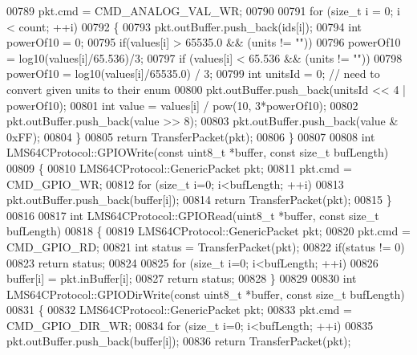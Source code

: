 \begin{DoxyCode}
{{{{{{{00789     pkt.cmd = CMD_ANALOG_VAL_WR;
00790 
00791     \textcolor{keywordflow}{for} (\textcolor{keywordtype}{size\_t} i = 0; i < count; ++i)
00792     \{
00793         pkt.outBuffer.push\_back(ids[i]);
00794         \textcolor{keywordtype}{int} powerOf10 = 0;
00795         \textcolor{keywordflow}{if}(values[i] > 65535.0 && (units != \textcolor{stringliteral}{""}))
00796             powerOf10 = log10(values[i]/65.536)/3;
00797         \textcolor{keywordflow}{if} (values[i] < 65.536 && (units != \textcolor{stringliteral}{""}))
00798             powerOf10 = log10(values[i]/65535.0) / 3;
00799         \textcolor{keywordtype}{int} unitsId = 0; \textcolor{comment}{// need to convert given units to their enum}
00800         pkt.outBuffer.push\_back(unitsId << 4 | powerOf10);
00801         \textcolor{keywordtype}{int} value = values[i] / pow(10, 3*powerOf10);
00802         pkt.outBuffer.push\_back(value >> 8);
00803         pkt.outBuffer.push\_back(value & 0xFF);
00804     \}
00805     \textcolor{keywordflow}{return} TransferPacket(pkt);
00806 \}
00807 
00808 \textcolor{keywordtype}{int} LMS64CProtocol::GPIOWrite(\textcolor{keyword}{const} uint8\_t *buffer, \textcolor{keyword}{const} \textcolor{keywordtype}{size\_t} bufLength)
00809 \{
00810     LMS64CProtocol::GenericPacket pkt;
00811     pkt.cmd = CMD_GPIO_WR;
00812     \textcolor{keywordflow}{for} (\textcolor{keywordtype}{size\_t} i=0; i<bufLength; ++i)
00813         pkt.outBuffer.push\_back(buffer[i]);
00814     \textcolor{keywordflow}{return} TransferPacket(pkt);
00815 \}
00816 
00817 \textcolor{keywordtype}{int} LMS64CProtocol::GPIORead(uint8\_t *buffer, \textcolor{keyword}{const} \textcolor{keywordtype}{size\_t} bufLength)
00818 \{
00819     LMS64CProtocol::GenericPacket pkt;
00820     pkt.cmd = CMD_GPIO_RD;
00821     \textcolor{keywordtype}{int} status = TransferPacket(pkt);
00822     \textcolor{keywordflow}{if}(status != 0)
00823         \textcolor{keywordflow}{return} status;
00824 
00825     \textcolor{keywordflow}{for} (\textcolor{keywordtype}{size\_t} i=0; i<bufLength; ++i)
00826         buffer[i] = pkt.inBuffer[i];
00827     \textcolor{keywordflow}{return} status;
00828 \}
00829 
00830 \textcolor{keywordtype}{int} LMS64CProtocol::GPIODirWrite(\textcolor{keyword}{const} uint8\_t *buffer, \textcolor{keyword}{const} \textcolor{keywordtype}{size\_t} bufLength)
00831 \{
00832     LMS64CProtocol::GenericPacket pkt;
00833     pkt.cmd = CMD_GPIO_DIR_WR;
00834     \textcolor{keywordflow}{for} (\textcolor{keywordtype}{size\_t} i=0; i<bufLength; ++i)
00835         pkt.outBuffer.push\_back(buffer[i]);
00836     \textcolor{keywordflow}{return} TransferPacket(pkt);
}}}}}}}
\end{DoxyCode}
